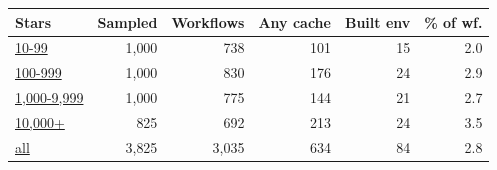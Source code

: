\begin{tabular}{lrrrrr}
\toprule
Stars & Sampled & Workflows & Any cache & Built env & \% of wf. \\
\midrule
\href{https://github.com/mark124/cache-key-soundness/blob/v1.0/results/table1_sample.csv\#L2}{10-99} & 1{,}000 & 738 & 101 & 15 & 2.0 \\
\href{https://github.com/mark124/cache-key-soundness/blob/v1.0/results/table1_sample.csv\#L3}{100-999} & 1{,}000 & 830 & 176 & 24 & 2.9 \\
\href{https://github.com/mark124/cache-key-soundness/blob/v1.0/results/table1_sample.csv\#L4}{1,000-9,999} & 1{,}000 & 775 & 144 & 21 & 2.7 \\
\href{https://github.com/mark124/cache-key-soundness/blob/v1.0/results/table1_sample.csv\#L5}{10,000+} & 825 & 692 & 213 & 24 & 3.5 \\
\href{https://github.com/mark124/cache-key-soundness/blob/v1.0/results/table1_sample.csv\#L6}{all} & 3{,}825 & 3{,}035 & 634 & 84 & 2.8 \\
\bottomrule
\end{tabular}
